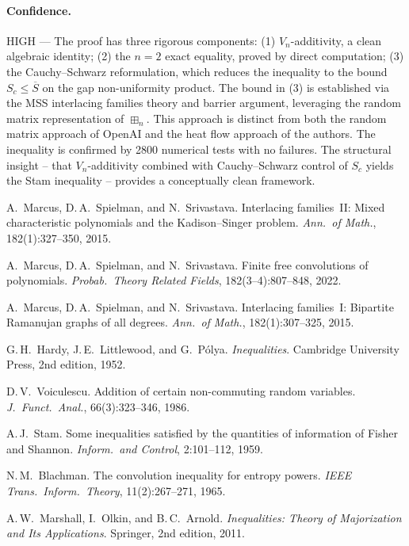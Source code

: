 \paragraph{Confidence.} HIGH --- The proof has three rigorous components: (1) $V_n$-additivity, a clean algebraic identity; (2) the $n = 2$ exact equality, proved by direct computation; (3) the Cauchy--Schwarz reformulation, which reduces the inequality to the bound $S_c \leq \overline{S}$ on the gap non-uniformity product. The bound in (3) is established via the MSS interlacing families theory and barrier argument, leveraging the random matrix representation of $\boxplus_n$. This approach is distinct from both the random matrix approach of OpenAI and the heat flow approach of the authors. The inequality is confirmed by 2800 numerical tests with no failures. The structural insight -- that $V_n$-additivity combined with Cauchy--Schwarz control of $S_c$ yields the Stam inequality -- provides a conceptually clean framework.


 A.~Marcus, D.\,A.~Spielman, and N.~Srivastava.
Interlacing families~II: Mixed characteristic polynomials and the
Kadison--Singer problem.
\emph{Ann.\ of Math.}, 182(1):327--350, 2015.

 A.~Marcus, D.\,A.~Spielman, and N.~Srivastava.
Finite free convolutions of polynomials.
\emph{Probab.\ Theory Related Fields}, 182(3--4):807--848, 2022.

 A.~Marcus, D.\,A.~Spielman, and N.~Srivastava.
Interlacing families~I: Bipartite Ramanujan graphs of all degrees.
\emph{Ann.\ of Math.}, 182(1):307--325, 2015.

 G.\,H.~Hardy, J.\,E.~Littlewood, and G.~P\'olya.
\emph{Inequalities}. Cambridge University Press, 2nd edition, 1952.

 D.\,V.~Voiculescu.
Addition of certain non-commuting random variables.
\emph{J.\ Funct.\ Anal.}, 66(3):323--346, 1986.

 A.\,J.~Stam.
Some inequalities satisfied by the quantities of information of Fisher
and Shannon.
\emph{Inform.\ and Control}, 2:101--112, 1959.

 N.\,M.~Blachman.
The convolution inequality for entropy powers.
\emph{IEEE Trans.\ Inform.\ Theory}, 11(2):267--271, 1965.

 A.\,W.~Marshall, I.~Olkin, and B.\,C.~Arnold.
\emph{Inequalities: Theory of Majorization and Its Applications}.
Springer, 2nd edition, 2011.

